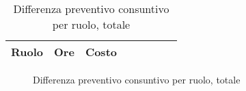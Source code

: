\begin{table}[H]
\centering
\begin{tabular}{lccccccc}
\toprule
    \textbf{Ruolo}  & \textbf{Ore} & \textbf{Costo} \\
    \midrule
    
    	
    
    \bottomrule
\end{tabular}
\caption{Differenza preventivo consuntivo per ruolo, totale}
\end{table}

\begin{figure}[H]
\centering
{}
\caption{Differenza preventivo consuntivo per ruolo, totale}
\end{figure}